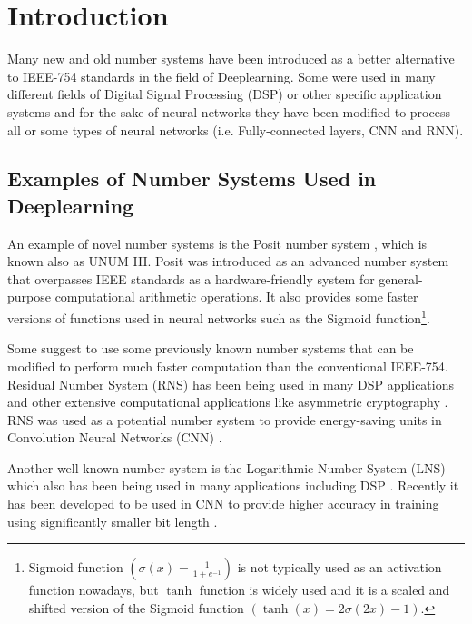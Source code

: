 \section{Introduction}

Many new and old number systems have been introduced as a better alternative to IEEE-754 standards \cite{754} in the field of Deeplearning. Some were used in many different fields of Digital Signal Processing (DSP) or other specific application systems and for the sake of neural networks they have been modified to process all or some types of neural networks (i.e. Fully-connected layers, CNN and RNN).

\subsection{Examples of Number Systems Used in Deeplearning}

An example of novel number systems is the Posit number system \cite{Gustafson2017}, which is known also as UNUM III. Posit was introduced as an advanced number system that overpasses IEEE standards as a hardware-friendly system for general-purpose computational arithmetic operations. It also provides some faster versions of functions used in neural networks such as the Sigmoid function\footnote{Sigmoid function $\left(\sigma(x) = \frac{1}{1 + e^{-1}}\right)$ is not typically used as an activation function nowadays, but $\tanh$ function is widely used and it is a scaled and shifted version of the Sigmoid function $\left(\tanh(x) = 2 \sigma(2x) -1\right)$.}.

Some suggest to use some previously known number systems that can be modified to perform much faster computation than the conventional IEEE-754. Residual Number System (RNS) \cite{Garner1959} has been being used in many DSP applications \cite{Cardarilli2007,Chaves2003,Claudio1995,DiClaudio1990,Jullien1987} and other extensive computational applications like asymmetric cryptography \cite{Hizzani2019,Asif2018a,Schinianakis2014,Antao2014}. RNS was used as a potential number system to provide energy-saving units in Convolution Neural Networks (CNN) \cite{Samimi2020}.

Another well-known number system is the Logarithmic Number System (LNS) \cite{Kingsbury1971,Alexopoulos1975,Lee1977} which also has been being used in many applications including DSP \cite{Dimitrov2001,Lewis1995}. Recently it has been developed to be used in CNN to provide higher accuracy in training using significantly smaller bit length \cite{Miyashita2016,Juang2019}.

